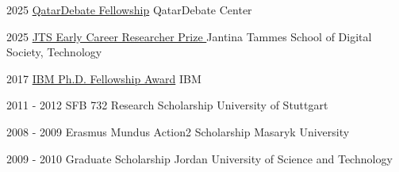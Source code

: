 
\cvevent
{2025} 
{ \href{https://qatardebate.org/programs/academic-programs/qdfellowship/}
      {QatarDebate Fellowship}} %
{QatarDebate Center\\} %

\cvevent
{2025} 
{ \href{https://www.rug.nl/jantina-tammes-school/research/funding-grants-prizes/jts-early-career-researcher-prize?lang=en}
      {JTS Early Career Researcher Prize }} %
{Jantina Tammes School of Digital Society, Technology \\} %


\cvevent
{2017} 
{ \href{https://www.research.ibm.com/university/awards/fellowships.html}
      {IBM Ph.D. Fellowship Award}} %
{IBM} %


\cvevent
{2011 - 2012} %
{SFB 732 Research Scholarship} %
{University of Stuttgart} %



\cvevent
{2008 - 2009} %
{Erasmus Mundus Action2 Scholarship} %
{Masaryk University} %



\cvevent
{2009 - 2010} %
{Graduate Scholarship} %
{Jordan University of Science and Technology} %


